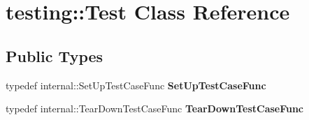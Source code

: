 \hypertarget{classtesting_1_1Test}{}\section{testing\+:\+:Test Class Reference}
\label{classtesting_1_1Test}
\subsection*{Public Types}
\begin{DoxyCompactItemize}
\item 
typedef internal\+::\+Set\+Up\+Test\+Case\+Func {\bfseries Set\+Up\+Test\+Case\+Func}\hypertarget{classtesting_1_1Test_a5f2a051d1d99c9b784c666c586186cf9}{}\label{classtesting_1_1Test_a5f2a051d1d99c9b784c666c586186cf9}

\item 
typedef internal\+::\+Tear\+Down\+Test\+Case\+Func {\bfseries Tear\+Down\+Test\+Case\+Func}\hypertarget{classtesting_1_1Test_aa0f532e93b9f3500144c53f31466976c}{}\label{classtesting_1_1Test_aa0f532e93b9f3500144c53f31466976c}

\end{DoxyCompactItemize}
